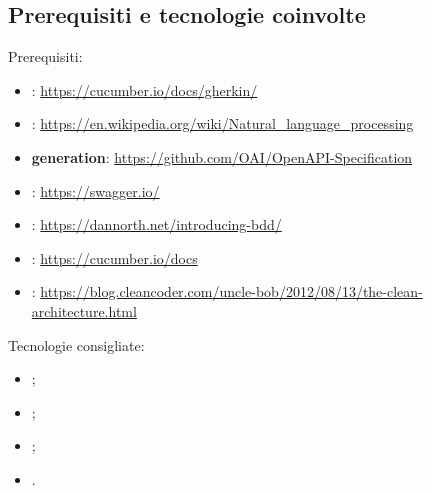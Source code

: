 \subsection{Prerequisiti e tecnologie coinvolte}
Prerequisiti:
\begin{itemize}
\item \textbf{}: \url{https://cucumber.io/docs/gherkin/}
\item \textbf{}: \url{https://en.wikipedia.org/wiki/Natural_language_processing}
\item \textbf{ generation}: \url{https://github.com/OAI/OpenAPI-Specification}
\item \textbf{}: \url{https://swagger.io/}
\item \textbf{}: \url{https://dannorth.net/introducing-bdd/}
\item \textbf{}: \url{https://cucumber.io/docs}
\item \textbf{}: \url{https://blog.cleancoder.com/uncle-bob/2012/08/13/the-clean-architecture.html}
\end{itemize}
Tecnologie consigliate:
\begin{itemize}
\item {};
\item {};
\item {};
\item {}.
\end{itemize}

